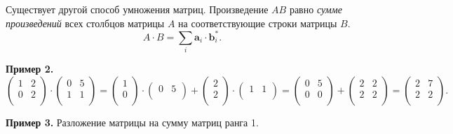 \documentclass[11pt,a4paper]{article}
\begin{document}
Существует другой способ умножения матриц. Произведение \(AB\) равно
\emph{сумме произведений} всех столбцов матрицы \(A\) на соответствующие
строки матрицы \(B\).
\[ A \cdot B = \sum_i \mathbf{a}_i \cdot \mathbf{b}_i^*. \]

\textbf{Пример 2.} \[
  \begin{pmatrix}
     1 & 2 \\
     0 & 2 \\
  \end{pmatrix}
  \cdot
  \begin{pmatrix}
     0 & 5 \\
     1 & 1 \\
  \end{pmatrix}
  =
  \begin{pmatrix}
     1 \\
     0 \\
  \end{pmatrix}
  \cdot
  \begin{pmatrix}
     0 & 5 \\
  \end{pmatrix}
  +
  \begin{pmatrix}
     2 \\
     2 \\
  \end{pmatrix}
  \cdot
  \begin{pmatrix}
     1 & 1 \\
  \end{pmatrix}
  =
  \begin{pmatrix}
     0 & 5 \\
     0 & 0 \\
  \end{pmatrix}
  +
  \begin{pmatrix}
     2 & 2 \\
     2 & 2 \\
  \end{pmatrix}
  =
  \begin{pmatrix}
     2 & 7 \\
     2 & 2 \\
  \end{pmatrix}.
\]

    \textbf{Пример 3.} Разложение матрицы на сумму матриц ранга 1.
\end{document}
